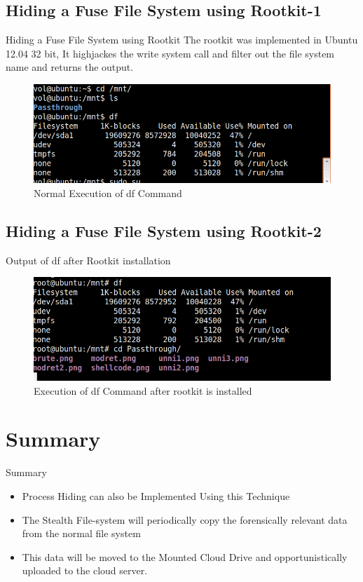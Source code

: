 \documentclass{beamer}
\begin{document}
\subsection{Hiding a Fuse File System using Rootkit-1}
\begin{frame}{Hiding a Fuse File System using Rootkit}
The rootkit was implemented in Ubuntu 12.04 32 bit, It highjackes the write system call and filter out the file system name and returns the output.

\begin{figure}
\includegraphics[width=.8\textwidth,height=.3\textheight]{images/normal}
\caption{Normal Execution of df Command}
\end{figure}

\end{frame}
\subsection{Hiding a Fuse File System using Rootkit-2}
\begin{frame}{Output of df after Rootkit installation}
\begin{figure}
\includegraphics[width=.8\textwidth,height=.3\textheight]{images/rooty}

\caption{ Execution of df Command after rootkit is installed}
\end{figure}

\end{frame}
\section{Summary}
\begin{frame}{Summary}
  \begin{itemize}
  \item
    \alert{Process Hiding} can also be Implemented Using this Technique
  \item
    The \alert{Stealth File-system}  will periodically copy the forensically relevant data from the normal file system
  \item This data will be moved to the \alert{Mounted Cloud Drive} and opportunistically uploaded to the cloud server. 
  \end{itemize}
  
 
\end{frame}
\end{document}
